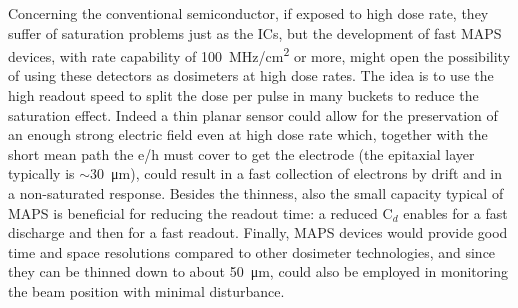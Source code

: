            Concerning the conventional semiconductor, if exposed to high dose rate, they suffer of saturation problems just as the ICs, but the development of fast MAPS devices, with rate capability of \SI{100}{MHz/cm\squared} or more, might open the possibility of using these detectors as dosimeters at high dose rates. 
            The idea is to use the high readout speed to split the dose per pulse in many buckets to reduce the saturation effect.
            Indeed a thin planar sensor could allow for the preservation of an enough strong electric field even at high dose rate which, together with the short mean path the e/h must cover to get the electrode (the epitaxial layer typically is $\sim$\SI{30}{\um}), could result in a fast collection of electrons by drift and in a non-saturated response.
            Besides the thinness, also the small capacity typical of MAPS is beneficial for reducing the readout time: a reduced C$_d$ enables for a fast discharge and then for a fast readout. 
            Finally, MAPS devices would provide good time and space resolutions compared to other dosimeter technologies, and since they can be thinned down to about \SI{50}{\um}, could also be employed in monitoring the beam position with minimal disturbance.
            
